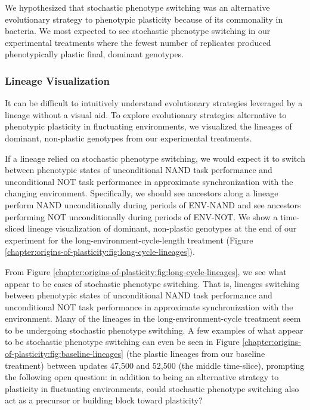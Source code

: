 We hypothesized that stochastic phenotype switching was an alternative evolutionary strategy to phenotypic plasticity because of its commonality in bacteria. 
We most expected to see stochastic phenotype switching in our experimental treatments where the fewest number of replicates produced phenotypically plastic final, dominant genotypes. 

\subsubsection{Lineage Visualization}

It can be difficult to intuitively understand evolutionary strategies leveraged by a lineage without a visual aid.
To explore evolutionary strategies alternative to phenotypic plasticity in fluctuating environments, we visualized the lineages of dominant, non-plastic genotypes from our experimental treatments. 



If a lineage relied on stochastic phenotype switching, we would expect it to switch between phenotypic states of unconditional NAND task performance and unconditional NOT task performance in approximate synchronization with the changing environment. 
Specifically, we should see ancestors along a lineage perform NAND unconditionally during periods of ENV-NAND and see ancestors performing NOT unconditionally during periods of ENV-NOT. 
We show a time-sliced lineage visualization of dominant, non-plastic genotypes at the end of our experiment for the long-environment-cycle-length treatment (Figure \ref{chapter:origins-of-plasticity:fig:long-cycle-lineages}).  

From Figure \ref{chapter:origins-of-plasticity:fig:long-cycle-lineages}, we see what appear to be cases of stochastic phenotype switching.
That is, lineages switching between phenotypic states of unconditional NAND task performance and unconditional NOT task performance in approximate synchronization with the environment. 
Many of the lineages in the long-environment-cycle treatment seem to be undergoing stochastic phenotype switching. 
A few examples of what appear to be stochastic phenotype switching can even be seen in Figure \ref{chapter:origins-of-plasticity:fig:baseline-lineages} (the plastic lineages from our baseline treatment) between updates 47,500 and 52,500 (the middle time-slice), prompting the following open question: in addition to being an alternative strategy to plasticity in fluctuating environments, could stochastic phenotype switching also act as a precursor or building block toward plasticity? 

